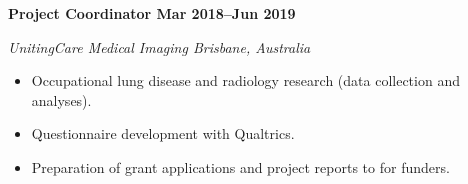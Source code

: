 \textbf{Project Coordinator \hfill Mar 2018--Jun 2019}\par
\textit{UnitingCare Medical Imaging \hfill Brisbane, Australia}\par
\begin{itemize}
    \item Occupational lung disease and radiology research (data collection and analyses).
	\item Questionnaire development with Qualtrics.
    \item Preparation of grant applications and project reports to for funders.
\end{itemize}\par